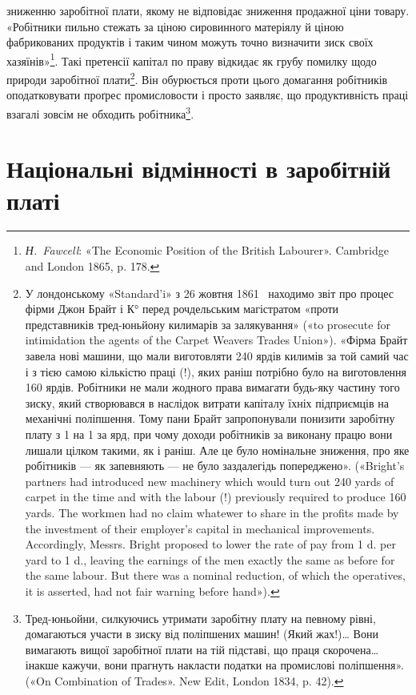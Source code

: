 зниженню заробітної плати, якому не відповідає зниження продажної
ціни товару. «Робітники пильно стежать за ціною сировинного
матеріялу й ціною фабрикованих продуктів і таким чином
можуть точно визначити зиск своїх хазяїнів»\footnote{
\emph{Н.~Fawcell}: «The Economic Position of the British Labourer».
Cambridge and London 1865, p. 178.
}. Такі претенсії
капітал по праву відкидає як грубу помилку щодо природи
заробітної плати\footnote{
У лондонському «Standard’i» з 26 жовтня 1861~ находимо звіт
про процес фірми Джон Брайт і К° перед рочдельським магістратом
«проти представників тред-юньйону килимарів за залякування»
(«to prosecute for intimidation the agents of the Carpet Weavers Trades
Union»). «Фірма Брайт завела нові машини, що мали виготовляти 240 ярдів
килимів за той самий час і з тією самою кількістю праці (!), яких
раніш потрібно було на виготовлення 160 ярдів. Робітники не мали жодного
права вимагати будь-яку частину того зиску, який створювався в наслідок
витрати капіталу їхніх підприємців на механічні поліпшення. Тому
пани Брайт запропонували понизити заробітну плату з 1 на
1 за ярд, при чому доходи робітників за виконану працю вони лишали
цілком такими, як і раніш. Але це було номінальне зниження, про яке
робітників — як запевняють — не було заздалегідь попереджено». («Bright’s
partners had introduced new machinery which would turn out 240 yards
of carpet in the time and with the labour (!) previously required to produce
160 yards. The workmen had no claim whatewer to share in the profits
made by the investment of their employer’s capital in mechanical improvements.
Accordingly, Messrs. Bright proposed to lower the rate of pay from
1 d. per yard to 1 d., leaving the earnings of the men exactly the same
as before for the same labour. But there was a nominal reduction, of which
the operatives, it is asserted, had not fair warning before hand»).
}. Він обурюється проти цього домагання робітників
оподатковувати проґрес промисловости і просто заявляє,
що продуктивність праці взагалі зовсім не обходить робітника\footnote{
Тред-юньойни, силкуючись утримати заробітну плату на певному
рівні, домагаються участи в зиску від поліпшених машин! (Який
жах!)\dots{} Вони вимагають вищої заробітної плати на тій підставі, що праця
скорочена\dots{} інакше кажучи, вони прагнуть накласти податки на промислові
поліпшення». («On Combination of Trades». New Edit, London
1834, p. 42).
}.

\section{Національні відмінності в заробітній платі}

